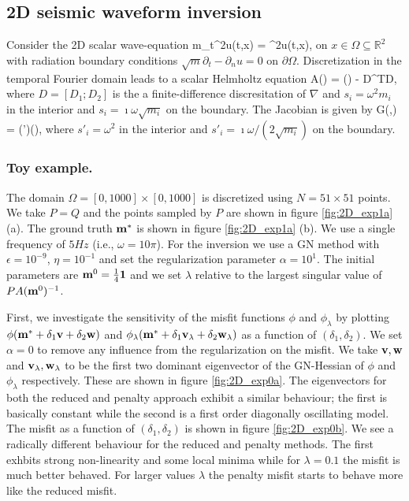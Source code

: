 \documentclass{iopart}
\begin{document}
\subsection{2D seismic waveform inversion}
Consider the 2D scalar wave-equation
\bq
m\partial_t^2u(t,x) = \nabla^2u(t,x),
\eq
on $x \in \Omega \subseteq \mathbb{R}^2$  with radiation boundary conditions $\sqrt{m}\partial_t - \partial_n u = 0$ on $\partial\Omega$.
Discretization in the temporal Fourier domain leads to a scalar Helmholtz equation
\bq
A() = () - D^TD,
\eq
where $D = [D_1; D_2]$ is the a finite-difference discresitation of $\nabla$ and $s_i = \omega^2 m_i$ in the interior 
and $s_i = \imath\omega\sqrt{m_i}$ on the boundary.
The Jacobian is given by
\bq
G(,) = (')(),
\eq
where $s'_i = \omega^2$ in the interior and $s'_i = \imath\omega/(2\sqrt{m_i})$ on the boundary.

\subsubsection{Toy example.}
The domain $\Omega = [0,1000]\times [0,1000]$ is discretized using $N=51\times 51$ points. We take $P=Q$ and the points sampled by 
$P$ are shown in figure \ref{fig:2D_exp1a} (a). The ground truth $\mathbf{m}^*$ is shown in figure  \ref{fig:2D_exp1a} (b). We use a single frequency
of $5 Hz$ (i.e., $\omega = 10\pi$).
For the inversion we use a GN method with $\epsilon=10^{-9}$, $\eta=10^{-1}$ and set the regularization parameter $\alpha = 10^{1}$.
The initial parameters are $\mathbf{m}^0 = \frac{1}{4}\mathbf{1}$ and we set $\lambda$ relative to the largest singular value of $PA(\mathbf{m}^0)^{-1}$.

First, we investigate the sensitivity of the misfit functions $\phi$ and $\phi_{\lambda}$ by plotting $\phi(\mathbf{m}^* + \delta_1 \mathbf{v} + \delta_2\mathbf{w})$ and
$\phi_{\lambda}(\mathbf{m}^* + \delta_1 \mathbf{v}_{\lambda} + \delta_2\mathbf{w}_{\lambda})$ as a function of $(\delta_1,\delta_2)$. We set $\alpha = 0$ to 
remove any influence from the regularization on the misfit.
We take $\mathbf{v}, \mathbf{w}$ and $\mathbf{v}_{\lambda}, \mathbf{w}_{\lambda}$ to be the first two dominant eigenvector of the GN-Hessian of 
$\phi$ and $\phi_{\lambda}$ respectively. These are shown in figure \ref{fig:2D_exp0a}. The eigenvectors for both the reduced and penalty
approach exhibit a similar behaviour; the first is basically constant while the second is a first order diagonally oscillating model.
The misfit as a function of $(\delta_1,\delta_2)$ is shown in figure \ref{fig:2D_exp0b}. We see a radically different behaviour for the reduced and penalty methods.
The first exhbits strong non-linearity and some local minima while for $\lambda=0.1$ the misfit is much better behaved. For larger values $\lambda$ the penalty misfit
starts to behave more like the reduced misfit.
\end{document}
